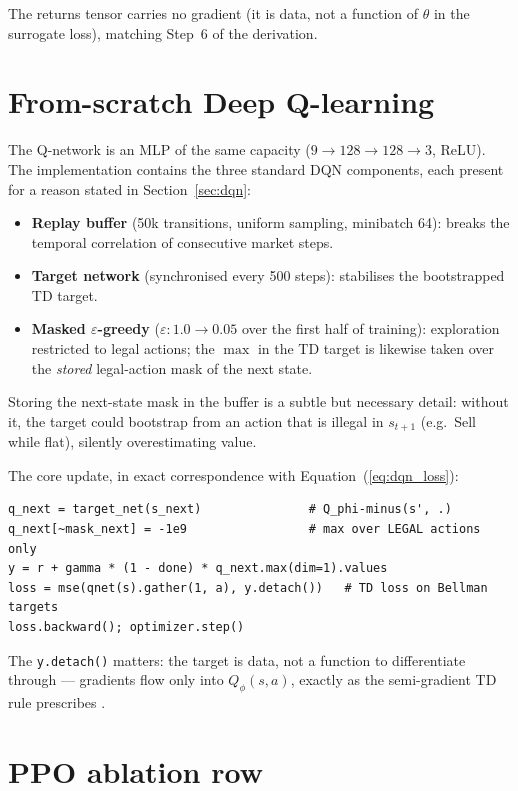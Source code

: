 The returns tensor carries no gradient (it is data, not a function of
$\theta$ in the surrogate loss), matching Step~6 of the derivation.

\section{From-scratch Deep Q-learning}
\label{sec:impl_dqn}

The Q-network is an MLP of the same capacity
($9 \to 128 \to 128 \to 3$, ReLU). The implementation contains the three
standard DQN components, each present for a reason stated in
Section~\ref{sec:dqn}:

\begin{itemize}
  \item \textbf{Replay buffer} (50k transitions, uniform sampling,
        minibatch 64): breaks the temporal correlation of consecutive
        market steps.
  \item \textbf{Target network} (synchronised every 500 steps): stabilises
        the bootstrapped TD target.
  \item \textbf{Masked $\varepsilon$-greedy} ($\varepsilon: 1.0 \to 0.05$
        over the first half of training): exploration restricted to legal
        actions; the $\max$ in the TD target is likewise taken over the
        \emph{stored} legal-action mask of the next state.
\end{itemize}

Storing the next-state mask in the buffer is a subtle but necessary
detail: without it, the target could bootstrap from an action that is
illegal in $s_{t+1}$ (e.g.\ Sell while flat), silently overestimating value.

The core update, in exact correspondence with
Equation~(\ref{eq:dqn_loss}):

\begin{verbatim}
q_next = target_net(s_next)               # Q_phi-minus(s', .)
q_next[~mask_next] = -1e9                 # max over LEGAL actions only
y = r + gamma * (1 - done) * q_next.max(dim=1).values
loss = mse(qnet(s).gather(1, a), y.detach())   # TD loss on Bellman targets
loss.backward(); optimizer.step()
\end{verbatim}

\noindent The \texttt{y.detach()} matters: the target is data, not a
function to differentiate through --- gradients flow only into
$Q_\phi(s,a)$, exactly as the semi-gradient TD rule prescribes
\cite{sutton2018}.

\section{PPO ablation row}
\label{sec:impl_ppo}

